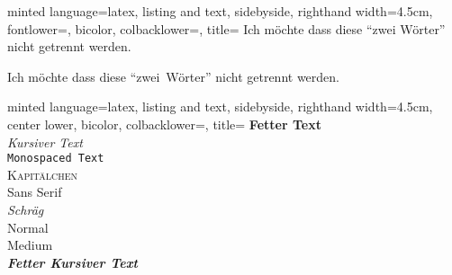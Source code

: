 \documentclass[
    ngerman,
    accentcolor=3b,
    dark_mode,
    fontsize= 12pt,
    a4paper,
    aspectratio=169,
    colorback=true,
    fancy_row_colors,
    leqno,
    fleqn,
    boxarc=3pt,
    fleqn,
]{algoslides}
\begin{document}
    \begin{frame}[c, fragile]
        \slidehead{}
        \begin{codeBlock}[]{
            minted language=latex,
            listing and text,
            sidebyside,
            righthand width=4.5cm,
            fontlower=\setlength{\parskip}{\medskipamount}\setlength{\parindent}{0em},
            bicolor,
            colbacklower=,
            title=
            }
            Ich möchte dass diese
            \enquote{zwei Wörter}
            nicht getrennt werden.

            Ich möchte dass diese
            \enquote{zwei~Wörter}
            nicht getrennt werden.
        \end{codeBlock}
    \end{frame}

    \begin{frame}[c, fragile]
        \slidehead{}
        \begin{codeBlock}[]{
            minted language=latex,
            listing and text,
            sidebyside,
            righthand width=4.5cm,
            center lower,
            bicolor,
            colbacklower=,
            title=
            }
            \textbf{Fetter Text}\\
            \textit{Kursiver Text}\\
            \texttt{Monospaced Text}\\
            \textsc{Kapitälchen}\\
            \textsf{Sans Serif}\\
            \textsl{Schräg}\\
            \textup{Normal}\\
            \textmd{Medium}\\
            \textbf{\textit{Fetter Kursiver Text}}
        \end{codeBlock}
    \end{frame}
\end{document}
